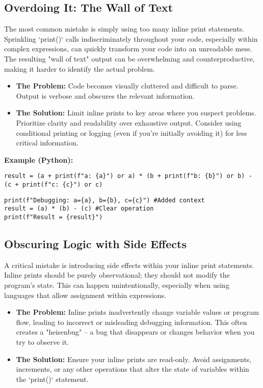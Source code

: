 \documentclass{article}
\begin{document}
{{{{\subsection*{Overdoing It: The Wall of Text}

The most common mistake is simply using too many inline print statements. Sprinkling `print()` calls indiscriminately throughout your code, especially within complex expressions, can quickly transform your code into an unreadable mess. The resulting "wall of text" output can be overwhelming and counterproductive, making it harder to identify the actual problem.

\begin{itemize}
    \item {\bf The Problem:} Code becomes visually cluttered and difficult to parse. Output is verbose and obscures the relevant information.
    \item {\bf The Solution:} Limit inline prints to key areas where you suspect problems.  Prioritize clarity and readability over exhaustive output. Consider using conditional printing or logging (even if you're initially avoiding it) for less critical information.
\end{itemize}

{\bf Example (Python):}

\begin{verbatim}
result = (a + print(f"a: {a}") or a) * (b + print(f"b: {b}") or b) - (c + print(f"c: {c}") or c)
\end{verbatim}

\begin{verbatim}
print(f"Debugging: a={a}, b={b}, c={c}") #Added context
result = (a) * (b) - (c) #Clear operation
print(f"Result = {result}")
\end{verbatim}

\subsection*{Obscuring Logic with Side Effects}

A critical mistake is introducing side effects within your inline print statements. Inline prints should be purely observational; they should not modify the program's state. This can happen unintentionally, especially when using languages that allow assignment within expressions.

\begin{itemize}
    \item {\bf The Problem:} Inline prints inadvertently change variable values or program flow, leading to incorrect or misleading debugging information. This often creates a "heisenbug" – a bug that disappears or changes behavior when you try to observe it.
    \item {\bf The Solution:} Ensure your inline prints are read-only. Avoid assignments, increments, or any other operations that alter the state of variables within the `print()` statement.
\end{itemize}

}}}}
\end{document}
